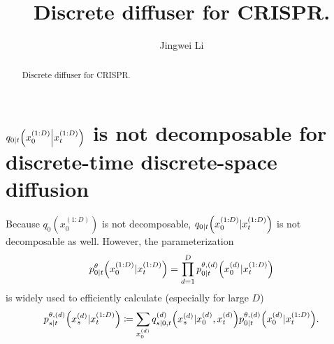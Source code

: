 \documentclass[10pt]{article}
\begin{document}
\title{
  \bf Discrete diffuser for CRISPR.
}

\author[1]{Jingwei Li}

\baselineskip=0pt


%

\maketitle

\begin{abstract}
Discrete diffuser for CRISPR.
\end{abstract}

\section{$q_{0|t}\qty(x^{(1:D)}_0\middle|x^{(1:D)}_t)$ is not decomposable for discrete-time discrete-space diffusion}
Because $q_0(x^{(1:D)}_0)$ is not decomposable, $q_{0|t}\qty(x^{(1:D)}_0|x^{(1:D)}_t)$ is not decomposable as well. However, the parameterization
\begin{eqnarray}\label{Eqp0tCompose}
  p^\theta_{0|t}\qty(x_0^{(1:D)}|x_t^{(1:D)}) = \prod_{d=1}^D p^{\theta,(d)}_{0|t}\qty(x_0^{(d)}|x_t^{(1:D)})
\end{eqnarray}
is widely used to efficiently calculate (especially for large $D$)
\begin{eqnarray*}
  p^{\theta,(d)}_{s|t}\qty(x^{(d)}_s|x^{(1:D)}_t)\coloneq \sum_{x^{(d)}_0}q^{(d)}_{s|0,t}\qty(x^{(d)}_s|x^{(d)}_0,x^{(d)}_t)p^{\theta,(d)}_{0|t}\qty(x^{(d)}_0|x^{(1:D)}_t).
\end{eqnarray*}
\end{document}
